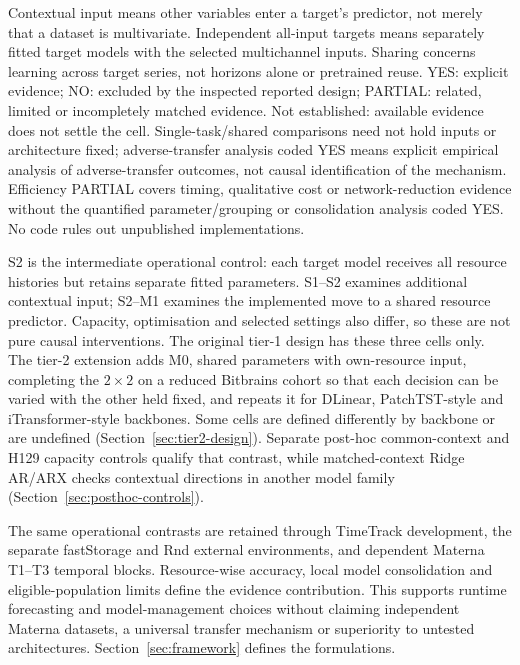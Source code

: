 \documentclass[5p,twocolumn]{elsarticle}
\begin{document}
\begin{table}[t]
  \vspace{2pt}
  \parbox{\textwidth}{\footnotesize
    Contextual input means other variables enter a target's predictor, not
    merely that a dataset is multivariate. Independent all-input targets means
    separately fitted target models with the selected multichannel inputs.
    Sharing concerns learning across target series, not horizons alone or
    pretrained reuse. YES: explicit evidence; NO: excluded by the inspected
    reported design; PARTIAL: related, limited or incompletely matched evidence.
    Not established: available evidence does not settle the cell.
    Single-task/shared comparisons need not hold inputs or architecture fixed;
    adverse-transfer analysis coded YES means explicit empirical analysis of
    adverse-transfer outcomes, not causal identification of the mechanism.
    Efficiency PARTIAL covers timing, qualitative cost or network-reduction
    evidence without the quantified parameter/grouping or consolidation analysis
    coded YES. No code rules out unpublished implementations.}
\end{table}


S2 is the intermediate operational control: each target model receives all
resource histories but retains separate fitted parameters. S1--S2 examines
additional contextual input; S2--M1 examines the implemented move to a shared
resource predictor. Capacity, optimisation and selected settings also differ,
so these are not pure causal interventions. The original tier-1 design has
these three cells only. The tier-2 extension adds M0, shared parameters with
own-resource input, completing the $2\times2$ on a reduced Bitbrains cohort
so that each decision can be varied with the other held fixed, and repeats
it for DLinear, PatchTST-style and iTransformer-style backbones. Some cells
are defined differently by backbone or are undefined
(Section~\ref{sec:tier2-design}).
Separate post-hoc common-context and H129 capacity controls qualify that
contrast, while matched-context Ridge AR/ARX checks contextual directions in
another model family (Section~\ref{sec:posthoc-controls}).

The same operational contrasts are retained through TimeTrack development,
the separate fastStorage and Rnd external environments, and dependent Materna
T1--T3 temporal blocks. Resource-wise accuracy, local model consolidation and
eligible-population limits define the evidence contribution. This supports
runtime forecasting and model-management choices without claiming independent
Materna datasets, a universal transfer mechanism or superiority to untested
architectures. Section~\ref{sec:framework} defines the formulations.
\end{document}
